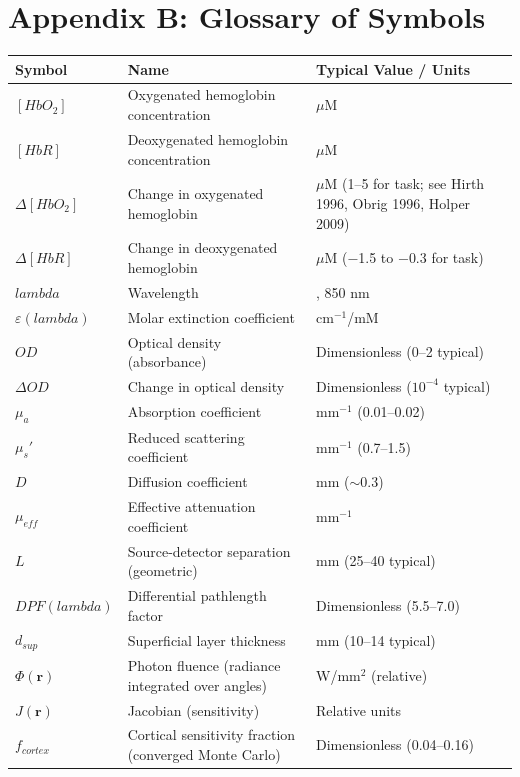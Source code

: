 \documentclass[12pt]{article}
\def\lambda{lambda}%
\def\mathrm#1{#1}%
\def\text#1{#1}%
\begin{document}
\section{Appendix B: Glossary of Symbols}

\begin{center}
\small
\begin{tabular}{@{}l >{\raggedright\arraybackslash}p{5.0cm} >{\raggedright\arraybackslash}p{6.0cm}@{}}
\hline
\textbf{Symbol} & \textbf{Name} & \textbf{Typical Value / Units} \\
\hline
$[\text{HbO}_2]$ & Oxygenated hemoglobin concentration & $\mu$M \\
$[\text{HbR}]$ & Deoxygenated hemoglobin concentration & $\mu$M \\
$\Delta[\text{HbO}_2]$ & Change in oxygenated hemoglobin & $\mu$M (1--5 for task; see Hirth 1996, Obrig 1996, Holper 2009) \\
$\Delta[\text{HbR}]$ & Change in deoxygenated hemoglobin & $\mu$M ($-$1.5 to $-$0.3 for task) \\
\hline
$\lambda$ & Wavelength & 760, 850 nm \\
$\varepsilon(\lambda)$ & Molar extinction coefficient & cm$^{-1}$/mM \\
$OD$ & Optical density (absorbance) & Dimensionless (0--2 typical) \\
$\Delta OD$ & Change in optical density & Dimensionless ($10^{-4}$ typical) \\
\hline
$\mu_a$ & Absorption coefficient & mm$^{-1}$ (0.01--0.02) \\
$\mu_s'$ & Reduced scattering coefficient & mm$^{-1}$ (0.7--1.5) \\
$D$ & Diffusion coefficient & mm ($\sim$0.3) \\
$\mu_{\mathrm{eff}}$ & Effective attenuation coefficient & mm$^{-1}$ \\
\hline
$L$ & Source-detector separation (geometric) & mm (25--40 typical) \\
$\text{DPF}(\lambda)$ & Differential pathlength factor & Dimensionless (5.5--7.0) \\
$d_{\text{sup}}$ & Superficial layer thickness & mm (10--14 typical) \\
\hline
$\Phi(\mathbf{r})$ & Photon fluence (radiance integrated over angles) & W/mm$^2$ (relative) \\
$J(\mathbf{r})$ & Jacobian (sensitivity) & Relative units \\
$f_{\text{cortex}}$ & Cortical sensitivity fraction (converged Monte Carlo) & Dimensionless (0.04--0.16) \\

\end{tabular}
\end{center}
\end{document}

